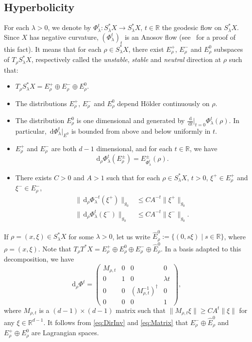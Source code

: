 \documentclass[JEP,XML,SOM,Unicode,published]{cedram}
\let\sep\mid
\newcommand{\rd}{\,\mathrm{d}}
\theoremstyle{plain}
\theoremstyle{definition}
\newcommand{\R}{\mathbb{R}}
\begin{document}
\subsection{Hyperbolicity}\label{ss:back_to_hyperbolicity}

For each $\lambda > 0$, we denote by $\Phi_\lambda^t:S_\lambda^*X\to S_\lambda^*X$, $t\in\R$ the geodesic flow on $S_\lambda^*X$.
Since $X$ has negative curvature, $(\Phi_\lambda^t)_t$ is an Anosov flow (see~\cite{Ebe} for a proof of this fact). It means that for each $\rho\in S_\lambda^*X$, there exist $E_\rho^+$, $E_\rho^-$ and $E_\rho^0$ subspaces of $T_\rho S_\lambda^*X$, respectively called the \emph{unstable}, \emph{stable} and \emph{neutral} direction at $\rho$ such that:
\begin{itemize}
\item $T_\rho S_\lambda^*X=E_\rho^+\oplus E_\rho^-\oplus E_\rho^0$.
\item The distributions $E_\rho^+$, $E_\rho^-$ and $E_\rho^0$ depend Hölder continuously on $\rho$.
\item The distribution $E_\rho^0$ is one dimensional and generated by $\frac{\rd}{\rd t}|_{t=0}\Phi^t_\lambda(\rho)$. In particular, $\rd \Phi^t_\lambda|_{E^0}$ is bounded from above and below uniformly in $t$.
\item $E_\rho^+$ and $E_\rho^-$ are both $d-1$ dimensional, and for each $t\in\R$, we have \begin{equation}\label{eq:DirInv}
\rd _\rho\Phi^t_\lambda(E^\pm_\rho)=E^\pm_{\Phi^t_\lambda}(\rho).
\end{equation}
\item There exists $C>0$ and $A>1$ such that for each $\rho\in S_\lambda^*X$, $t>0$, $\xi^+\in E^+_\rho$ and $\xi^-\in E^-_\rho$,
\begin{equation}\label{eq:DefHyp}
\begin{aligned}
\|\rd _\rho\Phi^{-t}_\lambda(\xi^+)\|_{g_0}&\leq C A^{-t} \|\xi^+\|_{g_0}\\
\|\rd _\rho\Phi^t_\lambda(\xi^-)\|_{g_0}&\leq C A^{-t}\|\xi^-\|_{g_0}.
\end{aligned}
\end{equation}
\end{itemize}

If $\rho = (x,\xi) \in S_\lambda^*X$ for some $\lambda>0$, let us write $\hat{E}^0_\rho :=\{(0,s\xi)\sep s\in\R\}$, where $\rho=(x,\xi)$. Note that $T_\rho T^*X = E_\rho^+\oplus E_\rho^0\oplus E_\rho^- \oplus \hat{E}_\rho^0$.
In a basis adapted to this decomposition, we have
\begin{equation}\label{eq:Matrix}
\rd _\rho \Phi^t = \begin{pmatrix}
M_{\rho,t} & 0 & 0 & 0\\
0 & 1 & 0 & \lambda t\\
0 & 0 & (M_{\rho,t}^{-1})^\dagger & 0\\
0 & 0 & 0 & 1
\end{pmatrix},
\end{equation}
where $M_{\rho,t}$ is a $(d-1) \times (d-1)$ matrix such that $\|M_{\rho,t} \xi\| \geq C A^t \|\xi\|$ for any $\xi \in \R^{d-1}$. It follows from \eqref{eq:DirInv} and \eqref{eq:Matrix} that $E_\rho^-\oplus \hat{E}^0_\rho$ and $E_\rho^+\oplus E_\rho^0$ are Lagrangian spaces.
\end{document}
